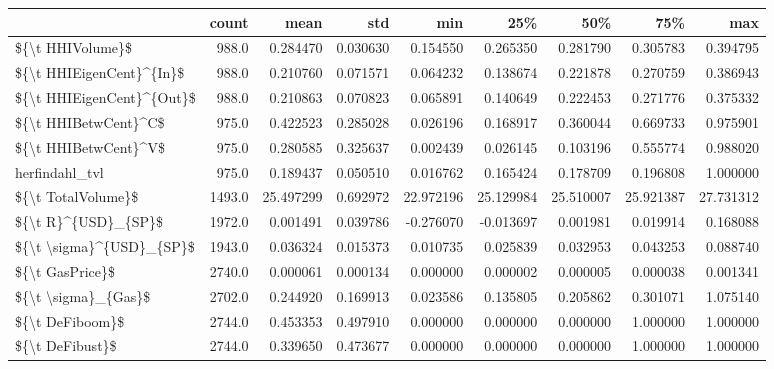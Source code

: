 \begin{tabular}{lrrrrrrrr}
\toprule
{} &   count &       mean &       std &        min &        25\% &        50\% &        75\% &        max \\
\midrule
\$\{\textbackslash t HHIVolume\}\$          &   988.0 &   0.284470 &  0.030630 &   0.154550 &   0.265350 &   0.281790 &   0.305783 &   0.394795 \\
\$\{\textbackslash t HHIEigenCent\}\textasciicircum \{In\}\$  &   988.0 &   0.210760 &  0.071571 &   0.064232 &   0.138674 &   0.221878 &   0.270759 &   0.386943 \\
\$\{\textbackslash t HHIEigenCent\}\textasciicircum \{Out\}\$ &   988.0 &   0.210863 &  0.070823 &   0.065891 &   0.140649 &   0.222453 &   0.271776 &   0.375332 \\
\$\{\textbackslash t HHIBetwCent\}\textasciicircum C\$      &   975.0 &   0.422523 &  0.285028 &   0.026196 &   0.168917 &   0.360044 &   0.669733 &   0.975901 \\
\$\{\textbackslash t HHIBetwCent\}\textasciicircum V\$      &   975.0 &   0.280585 &  0.325637 &   0.002439 &   0.026145 &   0.103196 &   0.555774 &   0.988020 \\
herfindahl\_tvl            &   975.0 &   0.189437 &  0.050510 &   0.016762 &   0.165424 &   0.178709 &   0.196808 &   1.000000 \\
\$\{\textbackslash t TotalVolume\}\$        &  1493.0 &  25.497299 &  0.692972 &  22.972196 &  25.129984 &  25.510007 &  25.921387 &  27.731312 \\
\$\{\textbackslash t R\}\textasciicircum \{USD\}\_\{SP\}\$       &  1972.0 &   0.001491 &  0.039786 &  -0.276070 &  -0.013697 &   0.001981 &   0.019914 &   0.168088 \\
\$\{\textbackslash t \textbackslash sigma\}\textasciicircum \{USD\}\_\{SP\}\$  &  1943.0 &   0.036324 &  0.015373 &   0.010735 &   0.025839 &   0.032953 &   0.043253 &   0.088740 \\
\$\{\textbackslash t GasPrice\}\$           &  2740.0 &   0.000061 &  0.000134 &   0.000000 &   0.000002 &   0.000005 &   0.000038 &   0.001341 \\
\$\{\textbackslash t \textbackslash sigma\}\_\{Gas\}\$       &  2702.0 &   0.244920 &  0.169913 &   0.023586 &   0.135805 &   0.205862 &   0.301071 &   1.075140 \\
\$\{\textbackslash t DeFiboom\}\$           &  2744.0 &   0.453353 &  0.497910 &   0.000000 &   0.000000 &   0.000000 &   1.000000 &   1.000000 \\
\$\{\textbackslash t DeFibust\}\$           &  2744.0 &   0.339650 &  0.473677 &   0.000000 &   0.000000 &   0.000000 &   1.000000 &   1.000000 \\
\bottomrule
\end{tabular}
